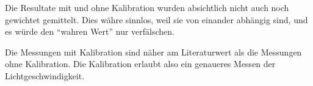 Die Resultate mit  und  ohne  Kalibration  wurden  absichtlich  nicht  auch noch
gewichtet  gemittelt.  Dies  w\"ahre sinnlos, weil sie von  einander  abh\"angig
sind, und es w\"urde den ``wahren Wert'' nur verf\"alschen.

Die Messungen mit Kalibration sind n\"aher am Literaturwert als  die Messungen
ohne  Kalibration.  Die Kalibration erlaubt  also  ein  genaueres  Messen  der
Lichtgeschwindigkeit.

